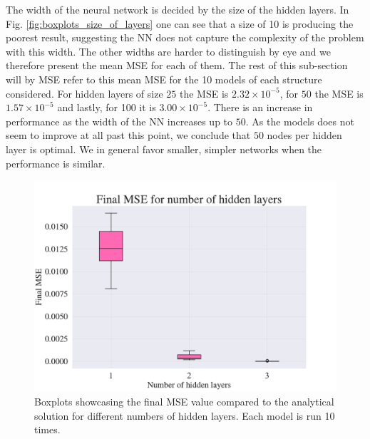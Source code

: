 
The width of the neural network is decided by the size of the hidden layers.
In Fig. \ref{fig:boxplots_size_of_layers} one can see that a size of 10 is producing the poorest result, suggesting the NN does not capture the complexity of the problem with this width. 
The other widths are harder to distinguish by eye and we therefore present the mean MSE for each of them. 
The rest of this sub-section will by MSE refer to this mean MSE for the 10 models of each structure considered.
For hidden layers of size $25$ the MSE is $2.32 \times 10^{-5}$, for $50$ the MSE is $1.57 \times 10^{-5}$ and lastly, for 100 it is $3.00 \times 10^{-5}$.
There is an increase in performance as the width of the NN increases up to $50$. 
As the models does not seem to improve at all past this point, we conclude that $50$ nodes per hidden layer is optimal.
We in general favor smaller, simpler networks when the performance is similar.

\begin{figure}[h!]
    \centering
    \includegraphics[width=1.0\linewidth]{project_3/plots/n_layers_search.pdf}
    \caption{Boxplots showcasing the final MSE value compared to the analytical solution for different numbers of hidden layers. Each model is run 10 times.}
    \label{fig:boxplots_number_of_hidden_layers}
\end{figure}


